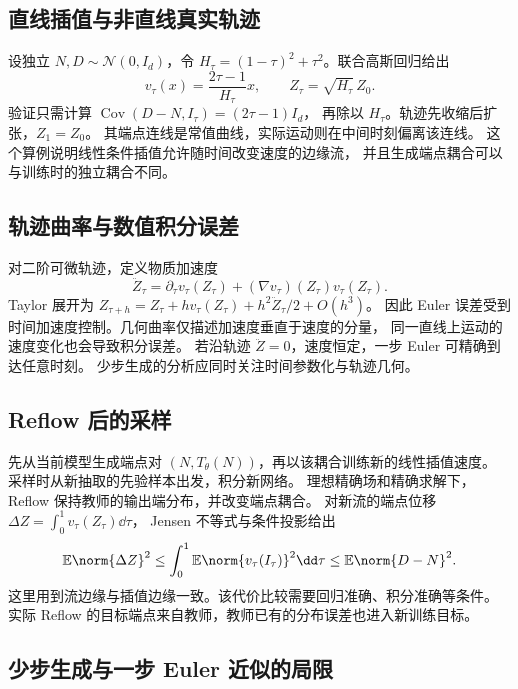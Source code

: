 \subsection{直线插值与非直线真实轨迹}

设独立 \(N,D\sim\mathcal N(0,I_d)\)，令
\(H_\tau=(1-\tau)^2+\tau^2\)。联合高斯回归给出
\begin{equation}
 v_\tau(x)=\frac{2\tau-1}{H_\tau}x,
 \qquad Z_\tau=\sqrt{H_\tau}\,Z_0.
 \label{eq:generation-rf-gaussian}
\end{equation}
验证只需计算 \(\operatorname{Cov}(D-N,I_\tau)=(2\tau-1)I_d\)，
再除以 \(H_\tau\)。轨迹先收缩后扩张，\(Z_1=Z_0\)。
其端点连线是常值曲线，实际运动则在中间时刻偏离该连线。
这个算例说明线性条件插值允许随时间改变速度的边缘流，
并且生成端点耦合可以与训练时的独立耦合不同。

\subsection{轨迹曲率与数值积分误差}

对二阶可微轨迹，定义物质加速度
\begin{equation}
 \ddot Z_\tau=\partial_\tau v_\tau(Z_\tau)
                +(\nabla v_\tau)(Z_\tau)v_\tau(Z_\tau).
 \label{eq:generation-acceleration}
\end{equation}
Taylor 展开为 \(Z_{\tau+h}=Z_\tau+h v_\tau(Z_\tau)
+h^2\ddot Z_\tau/2+O(h^3)\)。
因此 Euler 误差受到时间加速度控制。几何曲率仅描述加速度垂直于速度的分量，
同一直线上运动的速度变化也会导致积分误差。
若沿轨迹 \(\ddot Z=0\)，速度恒定，一步 Euler 可精确到达任意时刻。
少步生成的分析应同时关注时间参数化与轨迹几何。

\subsection{Reflow 后的采样}

先从当前模型生成端点对 \((N,T_\theta(N))\)，再以该耦合训练新的线性插值速度。
采样时从新抽取的先验样本出发，积分新网络。
理想精确场和精确求解下，Reflow 保持教师的输出端分布，并改变端点耦合。
对新流的端点位移 \(\Delta Z=\int_0^1v_\tau(Z_\tau)\dd\tau\)，
Jensen 不等式与条件投影给出
\[
 \mathbb E\norm{\Delta Z}^2
 \le\int_0^1\mathbb E\norm{v_\tau(I_\tau)}^2\dd\tau
 \le\mathbb E\norm{D-N}^2.
\]
这里用到流边缘与插值边缘一致。该代价比较需要回归准确、积分准确等条件。
实际 Reflow 的目标端点来自教师，教师已有的分布误差也进入新训练目标。

\subsection{少步生成与一步 Euler 近似的局限}

